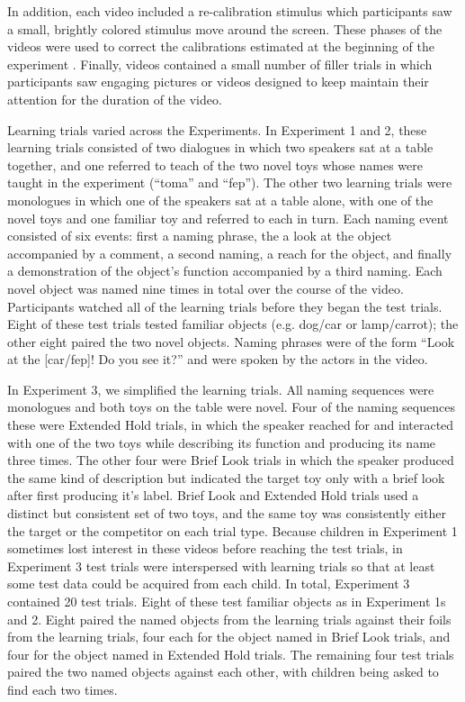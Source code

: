 \documentclass{pnastwo}
\begin{document}
\begin{article}
\begin{materials}
In addition, each video included a re-calibration stimulus which participants saw a small, brightly colored stimulus move around the screen. These phases of the videos were used to correct the calibrations estimated at the beginning of the experiment \cite[see][]{frank2012}. Finally, videos contained a small number of filler trials in which participants saw engaging pictures or videos designed to keep maintain their attention for the duration of the video.

Learning trials varied across the Experiments. In Experiment 1 and 2, these learning trials consisted of two dialogues in which two speakers sat at a table together, and one referred to teach of the two novel toys whose names were taught in the experiment (``toma'' and ``fep''). The other two learning trials were monologues in which one of the speakers sat at a table alone, with one of the novel toys and one familiar toy and referred to each in turn. Each naming event consisted of six events: first a naming phrase, the a look at the object accompanied by a comment, a second naming, a reach for the object, and finally a demonstration of the object's function accompanied by a third naming. Each novel object was named nine times in total over the course of the video. Participants watched all of the learning trials before they began the test trials. Eight of these test trials tested familiar objects (e.g. dog/car or lamp/carrot); the other eight paired the two novel objects. Naming phrases were of the form ``Look at the [car/fep]! Do you see it?'' and were spoken by the actors in the video.


In Experiment 3, we simplified the learning trials. All naming sequences were monologues and both toys on the table were novel.  Four of the naming sequences these were Extended Hold trials, in which the speaker reached for and interacted with one of the two toys while describing its function and producing its name three times. The other four were Brief Look trials in which the speaker produced the same kind of description but indicated the target toy only with a brief look after first producing it's label. Brief Look and Extended Hold trials used a distinct but consistent set of two toys, and the same toy was consistently either the target or the competitor on each trial type. Because children in Experiment 1 sometimes lost interest in these videos before reaching the test trials, in Experiment 3 test trials were interspersed with learning trials so that at least some test data could be acquired from each child. In total, Experiment 3 contained 20 test trials. Eight of these test familiar objects as in Experiment 1s and 2. Eight paired the named objects from the learning trials against their foils from the learning trials, four each for the object named in Brief Look trials, and four for the object named in Extended Hold trials. The remaining four test trials paired the two named objects against each other, with children being asked to find each two times.


\end{materials}
\end{article}
\end{document}
